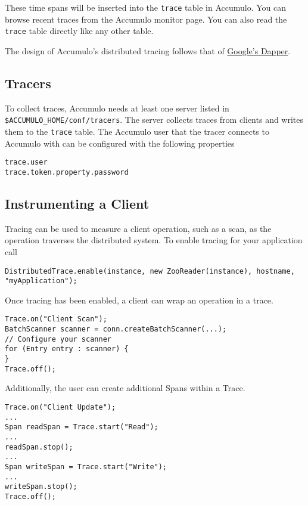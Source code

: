 These time spans will be inserted into the \texttt{trace} table in
Accumulo. You can browse recent traces from the Accumulo monitor
page. You can also read the \texttt{trace} table directly like any
other table.

The design of Accumulo's distributed tracing follows that of
\href{http://research.google.com/pubs/pub36356.html}{Google's Dapper}.

\subsection{Tracers}
To collect traces, Accumulo needs at least one server listed in
\\\texttt{\$ACCUMULO\_HOME/conf/tracers}. The server collects traces
from clients and writes them to the \texttt{trace} table. The Accumulo
user that the tracer connects to Accumulo with can be configured with
the following properties

\begingroup\fontsize{8pt}{8pt}\selectfont\begin{verbatim}
trace.user
trace.token.property.password
\end{verbatim}\endgroup

\subsection{Instrumenting a Client}
Tracing can be used to measure a client operation, such as a scan, as
the operation traverses the distributed system. To enable tracing for
your application call

\begingroup\fontsize{8pt}{8pt}\selectfont\begin{verbatim}
DistributedTrace.enable(instance, new ZooReader(instance), hostname, "myApplication");
\end{verbatim}\endgroup

Once tracing has been enabled, a client can wrap an operation in a trace.

\begingroup\fontsize{8pt}{8pt}\selectfont\begin{verbatim}
Trace.on("Client Scan");
BatchScanner scanner = conn.createBatchScanner(...);
// Configure your scanner
for (Entry entry : scanner) {
}
Trace.off();
\end{verbatim}\endgroup

Additionally, the user can create additional Spans within a Trace.
\begingroup\fontsize{8pt}{8pt}\selectfont\begin{verbatim}
Trace.on("Client Update");
...
Span readSpan = Trace.start("Read");
...
readSpan.stop();
...
Span writeSpan = Trace.start("Write");
...
writeSpan.stop();
Trace.off();
\end{verbatim}\endgroup

